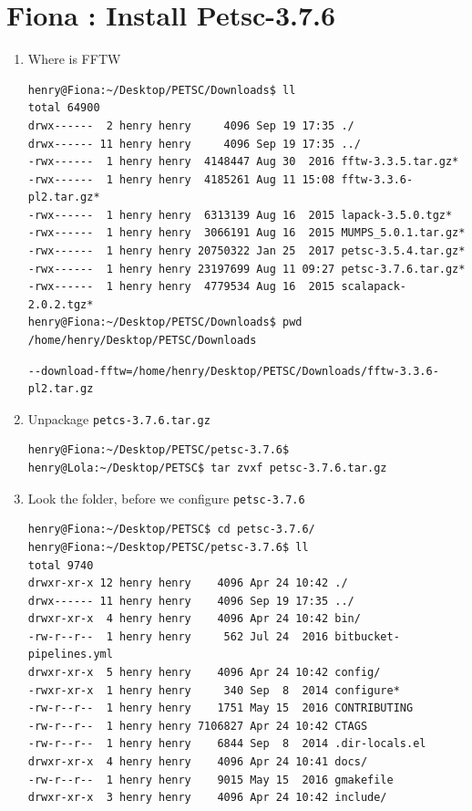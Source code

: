 \documentclass{article}
\begin{document}
\section{Fiona : Install Petsc-3.7.6}
\begin{enumerate}
\item Where is FFTW
\scriptsize
\begin{verbatim}
henry@Fiona:~/Desktop/PETSC/Downloads$ ll
total 64900
drwx------  2 henry henry     4096 Sep 19 17:35 ./
drwx------ 11 henry henry     4096 Sep 19 17:35 ../
-rwx------  1 henry henry  4148447 Aug 30  2016 fftw-3.3.5.tar.gz*
-rwx------  1 henry henry  4185261 Aug 11 15:08 fftw-3.3.6-pl2.tar.gz*
-rwx------  1 henry henry  6313139 Aug 16  2015 lapack-3.5.0.tgz*
-rwx------  1 henry henry  3066191 Aug 16  2015 MUMPS_5.0.1.tar.gz*
-rwx------  1 henry henry 20750322 Jan 25  2017 petsc-3.5.4.tar.gz*
-rwx------  1 henry henry 23197699 Aug 11 09:27 petsc-3.7.6.tar.gz*
-rwx------  1 henry henry  4779534 Aug 16  2015 scalapack-2.0.2.tgz*
henry@Fiona:~/Desktop/PETSC/Downloads$ pwd
/home/henry/Desktop/PETSC/Downloads
\end{verbatim}
\normalsize
\scriptsize
\begin{verbatim}
--download-fftw=/home/henry/Desktop/PETSC/Downloads/fftw-3.3.6-pl2.tar.gz
\end{verbatim}
\normalsize
\item Unpackage \verb+petcs-3.7.6.tar.gz+ 
\scriptsize
\begin{verbatim}henry@Fiona:~/Desktop/PETSC/petsc-3.7.6$ 
henry@Lola:~/Desktop/PETSC$ tar zvxf petsc-3.7.6.tar.gz 
\end{verbatim}
\normalsize
\item Look the folder, before we configure \verb+petsc-3.7.6+
\scriptsize
\begin{verbatim}
henry@Fiona:~/Desktop/PETSC$ cd petsc-3.7.6/
henry@Fiona:~/Desktop/PETSC/petsc-3.7.6$ ll
total 9740
drwxr-xr-x 12 henry henry    4096 Apr 24 10:42 ./
drwx------ 11 henry henry    4096 Sep 19 17:35 ../
drwxr-xr-x  4 henry henry    4096 Apr 24 10:42 bin/
-rw-r--r--  1 henry henry     562 Jul 24  2016 bitbucket-pipelines.yml
drwxr-xr-x  5 henry henry    4096 Apr 24 10:42 config/
-rwxr-xr-x  1 henry henry     340 Sep  8  2014 configure*
-rw-r--r--  1 henry henry    1751 May 15  2016 CONTRIBUTING
-rw-r--r--  1 henry henry 7106827 Apr 24 10:42 CTAGS
-rw-r--r--  1 henry henry    6844 Sep  8  2014 .dir-locals.el
drwxr-xr-x  4 henry henry    4096 Apr 24 10:41 docs/
-rw-r--r--  1 henry henry    9015 May 15  2016 gmakefile
drwxr-xr-x  3 henry henry    4096 Apr 24 10:42 include/

\end{verbatim}
\end{enumerate}
\end{document}
